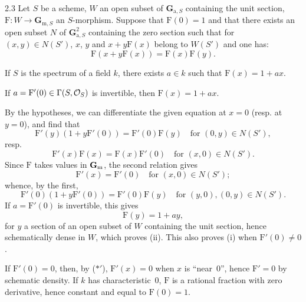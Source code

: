 \begin{lemma}{2.3}\label{XX.2.3}
Let $S$ be a scheme, $W$ an open subset of $\mathbf G_{\mathrm a,S}$ containing the unit section, $\mathrm F:W\to\mathbf G_{\mathrm m,S}$ an $S$-morphism. Suppose that $\mathrm F(0)=1$ and that there exists an open subset $N$ of $\mathbf G_{\mathrm a,S}^2$ containing the zero section such that for $(x,y)\in N(S')$, $x$, $y$ and $x+y\mathrm F(x)${\renewcommand{\thefootnote}{(17)}\footnotemark} belong to $W(S')$ and one has:
\begin{equation}\tag{$\dagger$}\label{XX.eq.dagger}
\mathrm F(x+y\mathrm F(x))=\mathrm F(x)\mathrm F(y).
\end{equation}
\begin{enumeratei}
\item If $S$ is the spectrum of a field $k$, there exists $a\in k$ such that $\mathrm F(x)=1+ax$.
\item If $a=\mathrm F'(0)\in\Gamma(S,\mathcal{O}_S)$ is invertible, then $\mathrm F(x)=1+ax$.
\end{enumeratei}
\end{lemma}
By the hypotheses, we can differentiate the given equation at $x=0$ (resp. at $y=0$), and find that
\begin{equation}\tag{$*$}\label{XX.eq.star}
\mathrm F'(y)(1+y\mathrm F'(0))=\mathrm F'(0)\mathrm F(y)\quad\text{for }(0,y)\in N(S'),
\end{equation}
resp.
\[
\mathrm F'(x)\mathrm F(x)=\mathrm F(x)\mathrm F'(0)\quad\text{for }(x,0)\in N(S').
\]
Since $\mathrm F$ takes values in $\mathbf{G}_{\mathrm{m}}$, the second relation gives
\begin{equation}\tag{$*'$}\label{XX.eq.starprime}
\mathrm F'(x)=\mathrm F'(0)\quad\text{for }(x,0)\in N(S');
\end{equation}
whence, by the first,
\[
\mathrm F'(0)(1+y\mathrm F'(0))=\mathrm F'(0)\mathrm F(y)\quad\text{for }(y,0),(0,y)\in N(S').
\]
If $a=\mathrm F'(0)$ is invertible, this gives
\[
\mathrm F(y)=1+ay,
\]
for $y$ a section of an open subset of $W$ containing the unit section, hence schematically dense in $W$, which proves (ii). This also proves (i) when $\mathrm F'(0)\ne0$.

If $\mathrm F'(0)=0$, then, by ($*'$), $\mathrm F'(x)=0$ when $x$ is ``near~0'', hence $\mathrm F'=0$ by schematic density. If $k$ has characteristic~0, $\mathrm F$ is a rational fraction with zero derivative, hence constant and equal to $\mathrm F(0)=1$.

